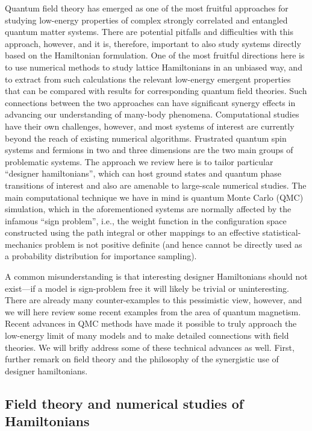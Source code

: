 \documentclass[range]{ar2e}
\begin{document}
Quantum field theory has emerged as one of the most fruitful approaches for studying low-energy properties of
complex strongly correlated and entangled quantum matter systems. There are potential pitfalls and difficulties 
with this approach, however, and it is, therefore, important to also study systems directly based on the Hamiltonian 
formulation. One of the most fruitful directions here is to use numerical methods to study lattice Hamiltonians 
in an unbiased way, and to extract from such calculations the relevant low-energy emergent properties that can 
be compared with results for corresponding quantum field theories. Such connections between the two approaches 
can have significant synergy effects in advancing our understanding of many-body phenomena. Computational studies 
have their own challenges, however, and most systems of interest are currently beyond the reach of existing 
numerical algorithms. Frustrated quantum spin systems and fermions in two and three dimensions are the two main 
groups of problematic systems. The approach we review here is to tailor particular ``designer hamiltonians'', which 
can host ground states and quantum phase transitions of interest and also are amenable to large-scale numerical 
studies. The main computational technique we have in mind is quantum Monte Carlo (QMC) simulation, which in the 
aforementioned systems are normally affected by the infamous ``sign problem'',\cite{Loh90,Henelius00} i.e., the 
weight function in the configuration space constructed using the path integral or other mappings to an effective 
statistical-mechanics problem is not positive definite (and hence cannot be directly used as a probability 
distribution for importance sampling).

A common misunderstanding is that interesting designer Hamiltonians should not exist---if a model is sign-problem 
free it will likely be trivial or uninteresting. There are already many counter-examples to this pessimistic view, however, 
and we will here review some recent examples from the area of quantum magnetism. Recent advances in QMC methods have made 
it possible to truly approach the low-energy limit of many models and to make detailed connections with field theories. 
We will brifly address some of these technical advances as well. First, further remark on field theory and the philosophy 
of the synergistic use of designer hamiltonians.

\subsection{Field theory and numerical studies of Hamiltonians}
\end{document}

